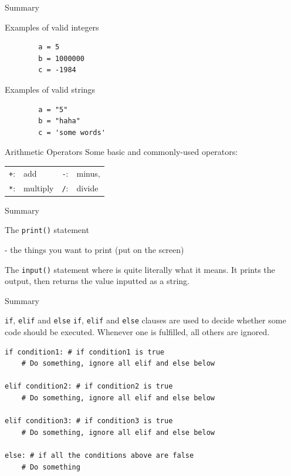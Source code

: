 \documentclass[dvipsnames, svgnames, x11names, handout]{beamer}
\begin{document}
\begin{frame}[fragile]{Summary}
    \begin{block}{Examples of valid integers}
        \begin{verbatim}
        a = 5  
        b = 1000000   
        c = -1984
        \end{verbatim}
    \end{block}
    \begin{block}{Examples of valid strings}
        \begin{verbatim}
        a = "5"
        b = "haha"   
        c = 'some words'
        \end{verbatim}
    \end{block}
    \begin{block}{Arithmetic Operators}
        Some basic and commonly-used operators:\\
        \centering
        \begin{tabular}{rlrl}
        \texttt{+}:& add & \texttt{-}:& minus,\\
        \texttt{*}:& multiply & \texttt{/}:& divide
        \end{tabular}
    \end{block}
\end{frame}

\begin{frame}[fragile]{Summary}
\begin{block}{The \texttt{print()} statement}

 - the things you want to print (put on the screen)
\end{block}

\begin{block}{The \texttt{input()} statement}
where  is quite literally what it means. It prints the output, then returns the value inputted as a string.
\end{block}
\end{frame}

\begin{frame}[fragile]{Summary}
\begin{block}{\texttt{if}, \texttt{elif} and \texttt{else}}
\texttt{if}, \texttt{elif} and \texttt{else} clauses are used to decide whether some code should be executed.
Whenever one is fulfilled, all others are ignored.
\begin{verbatim}
if condition1: # if condition1 is true
    # Do something, ignore all elif and else below

elif condition2: # if condition2 is true
    # Do something, ignore all elif and else below

elif condition3: # if condition3 is true
    # Do something, ignore all elif and else below

else: # if all the conditions above are false
    # Do something
\end{verbatim}
\end{block}
\end{frame}
\end{document}
